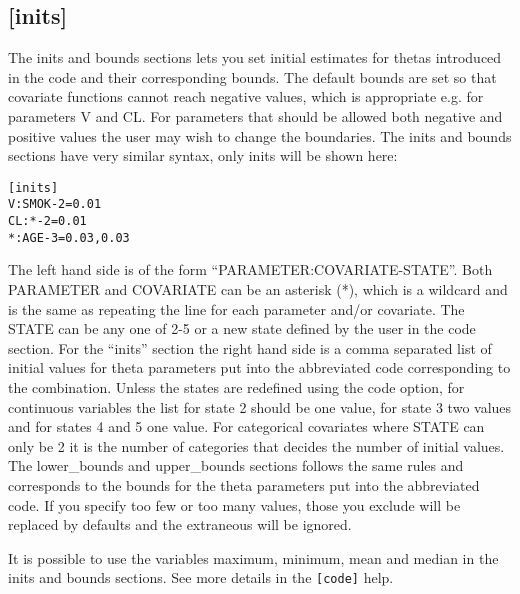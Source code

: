\subsection{[inits]}
The inits and bounds sections lets you set initial estimates for thetas introduced in the code and their corresponding bounds. The default bounds are set so that covariate functions cannot reach negative values, which is appropriate e.g. for parameters V and CL. For parameters that should be allowed both negative and positive values the user may wish to change the boundaries. The inits and bounds sections have very similar syntax, only inits will be shown here:

\begin{verbatim}
[inits]
V:SMOK-2=0.01
CL:*-2=0.01
*:AGE-3=0.03,0.03
\end{verbatim}

The left hand side is of the form “PARAMETER:COVARIATE-STATE”. Both PARAMETER and COVARIATE can be an asterisk (*), which is a wildcard and is the same as repeating the line for each parameter and/or covariate. The STATE can be any one of 2-5 or a new state defined by the user in the code section. For the “inits” section the right hand side is a comma separated list of initial values for theta parameters put into the abbreviated code corresponding to the combination. Unless the states are redefined using the code option, for continuous variables the list for state 2 should be one value, for state 3 two values and for states 4 and 5 one value. For categorical covariates where STATE can only be 2 it is the number of categories that decides the number of initial values. The lower\_bounds and upper\_bounds sections follows the same rules and corresponds to the bounds for the theta parameters put into the abbreviated code. If you specify too few or too many values, those you exclude will be replaced by defaults and the extraneous will be ignored. 

It is possible to use the variables maximum, minimum, mean and median in the inits and bounds sections. See more details in the \verb|[code]| help. 

